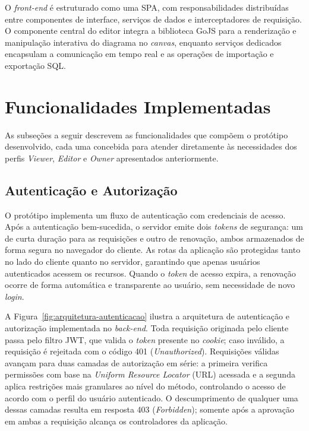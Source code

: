 O \textit{front-end} é estruturado como uma SPA, com responsabilidades distribuídas entre componentes de interface, serviços de dados e interceptadores de requisição. O componente central do editor integra a biblioteca GoJS para a renderização e manipulação interativa do diagrama no \textit{canvas}, enquanto serviços dedicados encapsulam a comunicação em tempo real e as operações de importação e exportação SQL.

\section{Funcionalidades Implementadas}

As subseções a seguir descrevem as funcionalidades que compõem o protótipo desenvolvido, cada uma concebida para atender diretamente às necessidades dos perfis \textit{Viewer}, \textit{Editor} e \textit{Owner} apresentados anteriormente.

\subsection{Autenticação e Autorização}

O protótipo implementa um fluxo de autenticação com credenciais de acesso. Após a autenticação bem-sucedida, o servidor emite dois \textit{tokens} de segurança: um de curta duração para as requisições e outro de renovação, ambos armazenados de forma segura no navegador do cliente. As rotas da aplicação são protegidas tanto no lado do cliente quanto no servidor, garantindo que apenas usuários autenticados acessem os recursos. Quando o \textit{token} de acesso expira, a renovação ocorre de forma automática e transparente ao usuário, sem necessidade de novo \textit{login}.

A Figura~\ref{fig:arquitetura-autenticacao} ilustra a arquitetura de autenticação e autorização implementada no \textit{back-end}. Toda requisição originada pelo cliente passa pelo filtro JWT, que valida o \textit{token} presente no \textit{cookie}; caso inválido, a requisição é rejeitada com o código 401 (\textit{Unauthorized}). Requisições válidas avançam para duas camadas de autorização em série: a primeira verifica permissões com base na \textit{Uniform Resource Locator} (URL) acessada e a segunda aplica restrições mais granulares ao nível do método, controlando o acesso de acordo com o perfil do usuário autenticado. O descumprimento de qualquer uma dessas camadas resulta em resposta 403 (\textit{Forbidden}); somente após a aprovação em ambas a requisição alcança os controladores da aplicação.

